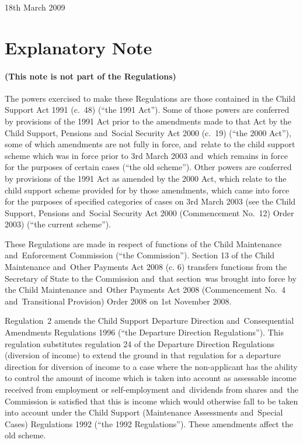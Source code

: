 \documentclass[12pt,a4paper]{article}
\begin{document}
18th March 2009

\small

\part{Explanatory Note}

\renewcommand\parthead{— Explanatory Note}

\subsection*{(This note is not part of the Regulations)}

The powers exercised to make these Regulations are those contained in the Child Support Act 1991 (c.~48) (“the 1991 Act”). Some of those powers are conferred by provisions of the 1991 Act prior to the amendments made to that Act by the Child Support, Pensions and~Social Security Act 2000 (c.~19) (“the 2000 Act”), some of which amendments are not fully in force, and~relate to the child support scheme which was in force prior to 3rd March 2003 and~which remains in force for the purposes of certain cases (“the old scheme”). Other powers are conferred by provisions of the 1991 Act as amended by the 2000 Act, which relate to the child support scheme provided for by those amendments, which came into force for the purposes of specified categories of cases on 3rd March 2003 (see the Child Support, Pensions and~Social Security Act 2000 (Commencement No.~12) Order 2003) (“the current scheme”).

These Regulations are made in respect of functions of the Child Maintenance and~Enforcement Commission (“the Commission”). Section 13 of the Child Maintenance and~Other Payments Act 2008 (c. 6) transfers functions from the Secretary of State to the Commission and~that section~was brought into force by the Child Maintenance and~Other Payments Act 2008 (Commencement No.~4 and~Transitional Provision) Order 2008 on 1st November 2008.

Regulation~2 amends the Child Support Departure Direction and~Consequential Amendments Regulations 1996 (“the Departure Direction Regulations”). This regulation substitutes regulation 24 of the Departure Direction Regulations (diversion of income) to extend the ground in that regulation for a departure direction for diversion of income to a case where the non-applicant has the ability to control the amount of income which is taken into account as assessable income received from employment or self-employment and~dividends from shares and~the Commission is satisfied that this is income which would otherwise fall to be taken into account under the Child Support (Maintenance Assessments and~Special Cases) Regulations 1992 (“the 1992 Regulations”). These amendments affect the old scheme.
\end{document}
